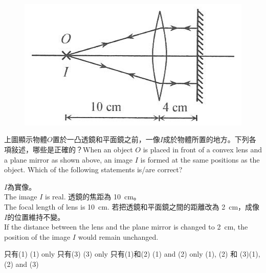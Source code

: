 \documentclass[beamer=true]{standalone}
\begin{document}
\begin{eg}
    \begin{figure}
        \centering
        \includegraphics[width=0.5\linewidth]{assets/dnu983.png}
    \end{figure}
    上圖顯示物體$O$置於一凸透鏡和平面鏡之前，一像$I$成於物體所置的地方。下列各項敍述，哪些是正確的？When an object $O$ is placed in front of a convex lens and a plane mirror as shown above, an image $I$ is formed at the same positions as the object. Which of the following statements is/are correct?

\end{eg}
\begin{eg}
    \begin{statements}[before-skip=.8em,after-item-skip=0em]
        \task $I$為實像。\\The image $I$ is real.
        \task 透鏡的焦距為 \qty{10}{cm}。\\The focal length of lens is \qty{10}{cm}.
        \task 若把透鏡和平面鏡之間的距離改為 \qty{2}{cm}，成像$I$的位置維持不變。\\If the distance between the lens and the plane mirror is changed to \qty{2}{cm}, the position of the image $I$ would remain unchanged.
    \end{statements}
    \begin{tasks} [before-skip=0em,after-item-skip=0.2em]
        \task 只有(1) \tab (1) only
        \task 只有(3) \tab (3) only
        \task 只有(1)和(2) \tab (1) and (2) only
        \task (1), (2) 和 (3)\tab (1), (2) and (3)
    \end{tasks}
\end{eg}
\end{document}
